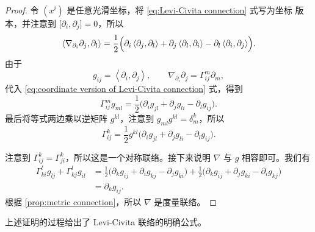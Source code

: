 \documentclass[fontset=none]{Notes}
\newcommand{\inn}[1]{\left\langle #1\right\rangle}
\begin{document}
\begin{proof}
  令 $(x^i)$ 是任意光滑坐标，将 \eqref{eq:Levi-Civita connection} 式写为坐标
  版本，并注意到 $\bigl[\partial_i,\partial_j\bigr]=0$，所以
  \begin{equation}\label{eq:coordinate version of Levi-Civita connection}
    \inn{\nabla_{\partial_i}\partial_j,\partial_l}=
    \frac{1}{2}\Bigl(\partial_i\inn{\partial_j,\partial_l}
    +\partial_j\inn{\partial_l,\partial_i}-\partial_l\inn{\partial_i,\partial_j}\Bigr).  
  \end{equation}
  由于
  \[
    g_{ij}=\inn{\partial_i,\partial_j}, \qquad \nabla_{\partial_i}\partial_j=\Gamma_{ij}^m  \partial_m,
  \]
  代入 \eqref{eq:coordinate version of Levi-Civita connection} 式，得到
  \begin{equation}
    \Gamma_{ij}^m g_{ml}=\frac{1}{2}\bigl(\partial_i g_{jl}+\partial_j g_{li}-\partial_l g_{ij}\bigr).
  \end{equation}
  最后将等式两边乘以逆矩阵 $g^{kl}$，注意到 $g_{ml}g^{kl}=\delta^k_m$，所以
  \begin{equation}
    \Gamma_{ij}^k=\frac{1}{2}g^{kl}\bigl(\partial_i g_{jl}+\partial_j g_{li}-\partial_l g_{ij}\bigr).
  \end{equation}

  注意到 $\Gamma_{ij}^k=\Gamma_{ji}^k$，所以这是一个对称联络。接下来说明
  $\nabla$ 与 $g$ 相容即可。我们有
  \begin{align*}
    \Gamma_{ki}^lg_{lj}+\Gamma_{kj}^lg_{il}&=\frac{1}{2}
    \bigl(\partial_kg_{ij}+\partial_ig_{kj}-\partial_jg_{ki}\bigr)
    +\frac{1}{2}
    \bigl(\partial_kg_{ij}+\partial_jg_{ki}-\partial_ig_{kj}\bigr)\\
    &=\partial_k g_{ij}.
  \end{align*}
  根据 \autoref{prop:metric connection}，所以 $\nabla$ 是度量联络。
\end{proof}

上述证明的过程给出了 Levi-Civita 联络的明确公式。
\end{document}
